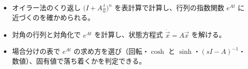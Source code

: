 \newcommand\kixlpole[3][kixlP]{\draw[#1, line width=1.3pt] (axis cs:#2,#3) ++(-1.3mm,-1.3mm) -- ++(2.6mm,2.6mm) (axis cs:#2,#3) ++(-1.3mm,1.3mm) -- ++(2.6mm,-2.6mm);}
\newcommand\kixlzero[3][kixlP]{\draw[#1, line width=1.1pt, fill=white] (axis cs:#2,#3) circle[radius=1.2mm];}
\newcommand\kixlhead[1]{\par\addvspace{6pt}\Needspace{6\baselineskip}\noindent{\sffamily\bfseries\color{\bkTT}#1}\par\nobreak\vspace{2pt}\noindent\ignorespaces}
\newcommand\kixlbox[1]{\par\addvspace{3pt}\noindent\textbf{#1}\par\vspace{3pt}\noindent\ignorespaces}
\newcommand\kixlline[1]{\par\addvspace{3pt}{\centering #1\par}\addvspace{3pt}\noindent\ignorespaces}
\newcommand\kixlframe[2][100mm]{\par\addvspace{4pt}{\centering\tikz\node[draw=\bkTT, line width=0.9pt, fill=bkTheme!6, rounded corners=1.5mm, inner xsep=6mm, inner ysep=2.5mm, align=center]{#2};\par}\addvspace{4pt}\noindent\ignorespaces}
\newcommand\kixla{\par\vspace{2pt}\noindent\rightskip=0pt plus 8em\relax\hangindent=2.6\zw\hangafter=0\relax}
\newcommand\kixlb{\par\vspace{2pt}\noindent\rightskip=0pt plus 8em\relax\hangindent=4.3\zw\hangafter=0\relax}
\newcommand\kixls{\rightskip=0pt plus 8em\relax}
\newcommand\kixlpm[1]{{\renewcommand\arraystretch{1}\begin{pmatrix}#1\end{pmatrix}}}
\makeatother


\begin{goal}
\begin{itemize}[label={\color{\bkTT}●}, leftmargin=1.6\zw, itemsep=0pt, topsep=1pt]
\item {}\enspace オイラー法のくり返し $\bigl(I+A\frac{t}{n}\bigr)^n$ を表計算で計算し、行列の指数関数 $e^{At}$ に近づくのを確かめられる。
\item {}\enspace 対角の行列と対角化で $e^{At}$ を計算し、状態方程式 $\dot{\vec x}=A\vec x$ を解ける。
\item {}\enspace 場合分けの表で $e^{At}$ の求め方を選び（回転・$\cosh$ と $\sinh$・$(sI-A)^{-1}$・数値）、固有値で落ち着くかを判定できる。
\end{itemize}
\end{goal}

